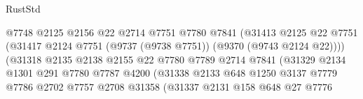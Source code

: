 \begin{lexlean}{RustStd}
\begin{coremodule}
                                          @7748
                                          @2125
                                          @2156
                                          @22
                                          @2714
                                          @7751
                                          @7780
                                          @7841
                                          (@31413
                                            @2125
                                            @22
                                            @7751
                                            (@31417
                                              @2124
                                              @7751
                                              (@9737 (@9738 @7751))
                                              (@9370 (@9743 @2124 @22))))
                                          (@31318
                                            @2135
                                            @2138
                                            @2155
                                            @22
                                            @7780
                                            @7789
                                            @2714
                                            @7841
                                            (@31329
                                              @2134
                                              @1301
                                              @291
                                              @7780
                                              @7787
                                              @4200
                                              (@31338
                                                @2133
                                                @648
                                                @1250
                                                @3137
                                                @7779
                                                @7786
                                                @2702
                                                @7757
                                                @2708
                                                @31358
                                                (@31337
                                                  @2131
                                                  @158
                                                  @648
                                                  @27
                                                  @7776

\end{coremodule}
\end{lexlean}
